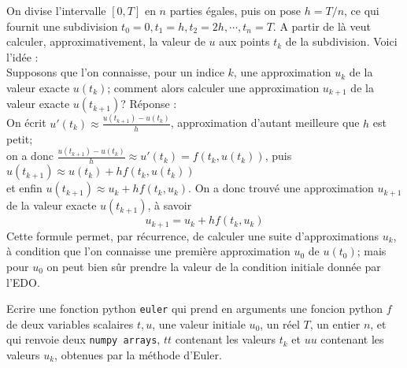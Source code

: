 \documentclass{exam}
\begin{document}
\begin{questions}
On divise l'intervalle $[0, T]$ en $n$ parties égales, puis on pose $h=T/n$, ce qui fournit une subdivision $t_0 = 0, t_1 = h, t_2 = 2h, \cdots, t_n = T$. A partir de là veut calculer, approximativement, la valeur de $u$ aux points $t_k$ de la subdivision. Voici l'idée :\\
Supposons que l'on connaisse, pour un indice $k$, une approximation $u_k$ de la valeur exacte $u(t_k)$; comment alors calculer une approximation $u_{k+1}$ de la valeur exacte $u(t_{k+1})$? Réponse :\\
On écrit $u'(t_k) \approx \frac{u(t_{k+1})-u(t_k)}{h}$, approximation d'autant meilleure que $h$ est petit;\\
 on a donc 
 $\frac{u(t_{k+1})-u(t_k)}{h} \approx u'(t_k) = f(t_k, u(t_k))$, puis $u(t_{k+1}) \approx u(t_k) + hf(t_k, u(t_k))$\\
  et enfin 
  $u(t_{k+1}) \approx u_k + hf(t_k, u_k)$. On a donc trouvé une approximation $u_{k+1}$ de la valeur exacte $u(t_{k+1})$, à savoir 
\begin{equation}
\label{euler}
u_{k+1} = u_k + hf(t_k, u_k)
\end{equation}
Cette formule permet, par récurrence, de calculer une suite d'approximations $u_k$, à condition que l'on connaisse une première approximation $u_0$ de $u(t_0)$; mais pour $u_0$ on peut bien sûr prendre la valeur de la condition initiale donnée par l'EDO.

\question
Ecrire une fonction python \texttt{euler} qui prend en arguments une foncion python $f$ de deux variables scalaires $t, u$, une valeur initiale $u_0$, un réel $T$, un entier $n$, et qui renvoie deux \texttt{numpy arrays}, $tt$ contenant les valeurs $t_k$ et $uu$ contenant les valeurs $u_k$, obtenues par la méthode d'Euler.
\question
{}
\end{questions}
\end{document}

